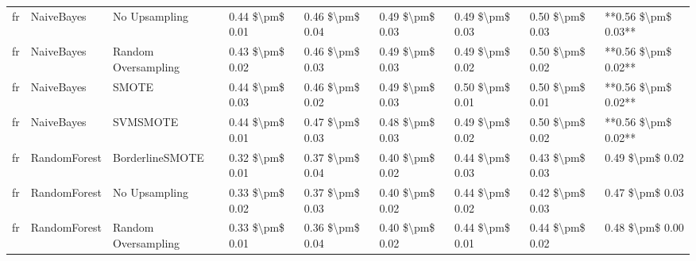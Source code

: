 \begin{tabular}{lllllllll}
      fr &                      NaiveBayes &                 No Upsampling & 0.44 \$\textbackslash pm\$ 0.01 &           0.46 \$\textbackslash pm\$ 0.04 &       0.49 \$\textbackslash pm\$ 0.03 &        0.49 \$\textbackslash pm\$ 0.03 &                         0.50 \$\textbackslash pm\$ 0.03 & **0.56 \$\textbackslash pm\$ 0.03** \\
      fr &                      NaiveBayes &           Random Oversampling & 0.43 \$\textbackslash pm\$ 0.02 &           0.46 \$\textbackslash pm\$ 0.03 &       0.49 \$\textbackslash pm\$ 0.03 &        0.49 \$\textbackslash pm\$ 0.02 &                         0.50 \$\textbackslash pm\$ 0.02 & **0.56 \$\textbackslash pm\$ 0.02** \\
      fr &                      NaiveBayes &                         SMOTE & 0.44 \$\textbackslash pm\$ 0.03 &           0.46 \$\textbackslash pm\$ 0.02 &       0.49 \$\textbackslash pm\$ 0.03 &        0.50 \$\textbackslash pm\$ 0.01 &                         0.50 \$\textbackslash pm\$ 0.01 & **0.56 \$\textbackslash pm\$ 0.02** \\
      fr &                      NaiveBayes &                      SVMSMOTE & 0.44 \$\textbackslash pm\$ 0.01 &           0.47 \$\textbackslash pm\$ 0.03 &       0.48 \$\textbackslash pm\$ 0.03 &        0.49 \$\textbackslash pm\$ 0.02 &                         0.50 \$\textbackslash pm\$ 0.02 & **0.56 \$\textbackslash pm\$ 0.02** \\
      fr &                    RandomForest &               BorderlineSMOTE & 0.32 \$\textbackslash pm\$ 0.01 &           0.37 \$\textbackslash pm\$ 0.04 &       0.40 \$\textbackslash pm\$ 0.02 &        0.44 \$\textbackslash pm\$ 0.03 &                         0.43 \$\textbackslash pm\$ 0.03 &     0.49 \$\textbackslash pm\$ 0.02 \\
      fr &                    RandomForest &                 No Upsampling & 0.33 \$\textbackslash pm\$ 0.02 &           0.37 \$\textbackslash pm\$ 0.03 &       0.40 \$\textbackslash pm\$ 0.02 &        0.44 \$\textbackslash pm\$ 0.02 &                         0.42 \$\textbackslash pm\$ 0.03 &     0.47 \$\textbackslash pm\$ 0.03 \\
      fr &                    RandomForest &           Random Oversampling & 0.33 \$\textbackslash pm\$ 0.01 &           0.36 \$\textbackslash pm\$ 0.04 &       0.40 \$\textbackslash pm\$ 0.02 &        0.44 \$\textbackslash pm\$ 0.01 &                         0.44 \$\textbackslash pm\$ 0.02 &     0.48 \$\textbackslash pm\$ 0.00 \\

\end{tabular}
